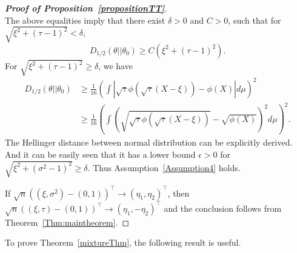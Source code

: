 \documentclass[11pt]{article}
\theoremstyle{plain}
\theoremstyle{definition}
\theoremstyle{remark}
\begin{document}
\begin{appendices}
\begin{proof}[\textbf{Proof of Proposition~\ref{propositionTT}}]
\begin{equation*}
\end{equation*}
The above equalities imply that there exist $\delta>0$ and $C>0$, such that for $\sqrt{\xi^2+(\tau-1)^2}<\delta$,
\begin{equation*}
    D_{1/2}(\theta||\theta_0)\geq C (\xi^2+(\tau-1)^2).
\end{equation*}
For $\sqrt{\xi^2+(\tau-1)^2}\geq\delta$, we have
\begin{equation*}
    \begin{split}
    D_{1/2}(\theta||\theta_0)
    &\geq
    \frac{1}{16}
    \left(\int \left|\sqrt{\tau}\phi(\sqrt{\tau}(X-\xi))-\phi(X)\right| d\mu\right)^2
    \\
    &\geq
    \frac{1}{16}
\left(\int \left(\sqrt{\sqrt{\tau}\phi(\sqrt{\tau}(X-\xi))}-\sqrt{\phi(X)}\right)^2 d\mu\right)^2
    .
\end{split}
\end{equation*}
The Hellinger distance between normal distribution can be explicitly derived. And it can be easily seen that it has a lower bound $\epsilon>0$ for $\sqrt{\xi^2+(\sigma^2-1)^2}\geq\delta$.
Thus Assumption~\ref{Assumption4} holds.

If $\sqrt{n}((\xi,\sigma^2)-(0,1))^\top \to (\eta_1,\eta_2)^\top  $, then $\sqrt{n}((\xi,\tau)-(0,1))^\top \to (\eta_1,-\eta_2)^\top  $ and the conclusion follows from Theorem~\ref{Thm:maintheorem}.
\end{proof}


To prove Theorem~\ref{mixtureThm}, the following result is useful.


\end{appendices}
\end{document}
